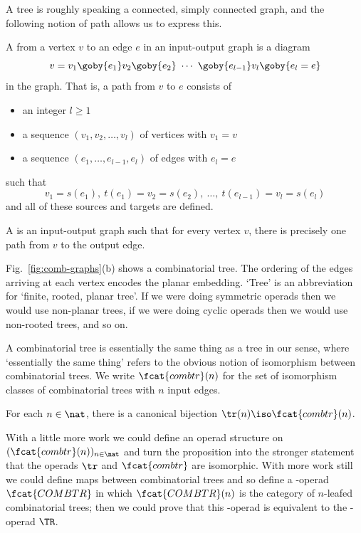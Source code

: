 A tree is roughly speaking a connected, simply connected graph, and the
following notion of path allows us to express this.  

\begin{defn}
A %
%
%
from a vertex $v$ to an edge $e$ in an input-output graph is
a diagram
\[
v= v_1 \goby{e_1} v_2 \goby{e_2} 
\ \cdots \ 
\goby{e_{l-1}} v_l \goby{e_l = e}
\]
in the graph.  That is, a path from $v$ to $e$ consists of
%
\begin{itemize}
\item an integer $l\geq 1$
\item a sequence $(v_1, v_2, \ldots, v_l)$ of vertices with $v_1=v$
\item a sequence $(e_1, \ldots, e_{l-1}, e_l)$ of edges with $e_l=e$
\end{itemize}
%
such that
\[
v_1 = s(e_1), \ 
t(e_1) = v_2 = s(e_2), \ 
\ldots, \ 
t(e_{l-1}) = v_l = s(e_l)
\]
and all of these sources and targets are defined.
\end{defn}

\begin{defn}
A \demph{combinatorial tree}%
%
%
is an input-output graph such that for every
vertex $v$, there is precisely one path from $v$ to the output edge.
\end{defn}
%
Fig.~\ref{fig:comb-graphs}(b) shows a combinatorial tree.  The ordering of
the edges arriving at each vertex encodes the planar embedding.  `Tree' is
an abbreviation for `finite, rooted,%
%
\index{root of tree}
%
planar tree'.  If we were doing
symmetric operads then we would use non-planar trees, if we were doing
cyclic operads then we would use non-rooted trees, and so on.

A combinatorial tree is essentially the same thing as a tree in our sense,
where `essentially the same thing' refers to the obvious notion of
isomorphism between combinatorial trees.  We write $\fcat{combtr}(n)$ for
the set of isomorphism classes of combinatorial trees with $n$ input edges.

\begin{propn}
For each $n\in\nat$, there is a canonical bijection $\tr(n) \iso
\fcat{combtr}(n)$. 
\end{propn}

With a little more work we could define an operad structure on
$(\fcat{combtr}(n))_{n\in\nat}$ and turn the proposition into the stronger
statement that the operads $\tr$ and $\fcat{combtr}$ are isomorphic.  With
more work still we could define maps between combinatorial trees and
so define a \Cat-operad $\fcat{COMBTR}$ in which $\fcat{COMBTR}(n)$ is the
category of $n$-leafed combinatorial trees; then we could prove that this
\Cat-operad is equivalent to the \Cat-operad $\TR$.


